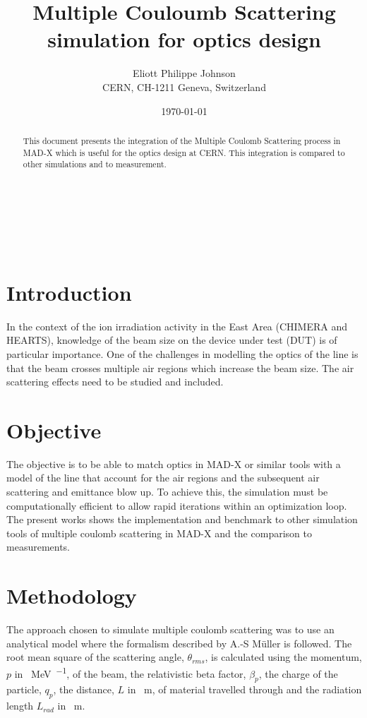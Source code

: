 \documentclass{cernatsnote}
\title{Multiple Couloumb Scattering simulation for optics design}
\author{
	Eliott Philippe Johnson \; \\		
	CERN, CH-1211 Geneva, Switzerland
}
\date{\today}
\begin{document}
\maketitle

\begin{abstract}
This document presents the integration of the Multiple Coulomb Scattering process in MAD-X which is useful for the optics design at CERN. This integration is compared to other simulations and to measurement. 
\end{abstract}
\\ \\ \\ 

\begingroup
\color{black}
\tableofcontents
\endgroup

\pagebreak

\section{Introduction}
In the context of the ion irradiation activity in the East Area (CHIMERA and HEARTS), knowledge of the beam size on the device under test (DUT) is of particular importance. One of the challenges in modelling the optics of the line is that the beam crosses multiple air regions which increase the beam size. The air scattering effects need to be studied and included.

\section{Objective}

The objective is to be able to match optics in MAD-X or similar tools with a model of the line that account for the air regions and the subsequent air scattering and emittance blow up. To achieve this, the simulation must be computationally efficient to allow rapid iterations within an optimization loop. The present works shows the implementation and benchmark to other simulation tools of multiple coulomb scattering in MAD-X and the comparison to measurements.

\section{Methodology}

The approach chosen to simulate multiple coulomb scattering was to use an analytical model where the formalism described by A.-S Müller \cite{muller_description_2001} is followed. The root mean square of the scattering angle, $\theta_{rms}$, is calculated using the momentum, $p$ in \SI{}{\mega\electronvolt\per{}}, of the beam, the relativistic beta factor, $\beta_{p}$, the charge of the particle, $q_{p}$, the distance, $L$ in \SI{}{m}, of material travelled through and the radiation length $L_{rad}$ in \SI{}{m}.
\end{document}
